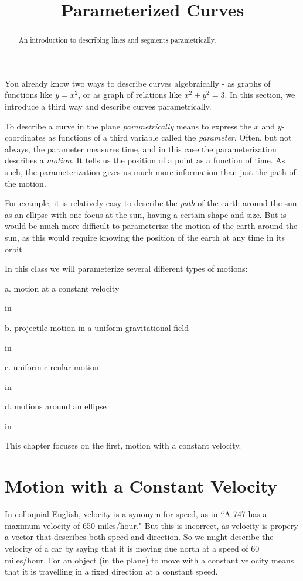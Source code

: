 \documentclass{ximera}
\title{Parameterized Curves}
\newcommand{\pskip}{\vskip 0.1 in}
\begin{document}
\begin{abstract}
An introduction to describing lines and segments parametrically.
\end{abstract}
\maketitle

You already know two ways to describe curves algebraically - as graphs of functions like $y=x^2$, or as graph of relations like $x^2 + y^2 = 3$. In this section, we introduce a third way and describe curves parametrically. 

To describe a curve in the plane \emph{parametrically} means to express the $x$ and $y$-coordinates as functions of a third variable called the \emph{parameter}. Often, but not always, the parameter measures time, and in this case the parameterization describes a \emph{motion}. It tells us the position of a point as a function of time. As such, the parameterization gives us much more information than just the path of the motion.

For example, it is relatively easy to describe the \emph{path} of the earth around the sun as an ellipse with one focus at the sun, having a certain shape and size. But is would be much more difficult to parameterize the motion of the earth around the sun, as this would require knowing the position of the earth at any time in its orbit.

In this class we will parameterize several different types of motions:

a. motion at a constant velocity

\pskip

b. projectile motion in a uniform gravitational field

\pskip

c. uniform circular motion

\pskip

d. motions around an ellipse

\pskip

This chapter focuses on the first, motion with a constant velocity.

\section{Motion with a Constant Velocity}

In colloquial English, velocity is a synonym for speed, as in ``A 747 has a maximum velocity of 650 miles/hour." But this is incorrect, as velocity is propery a vector that describes both speed and direction. So we might describe the velocity of a car by saying that it is moving due north at a speed of 60 miles/hour. For an object (in the plane) to move with a constant velocity means that it is travelling in a fixed direction at a constant speed.
\end{document}

